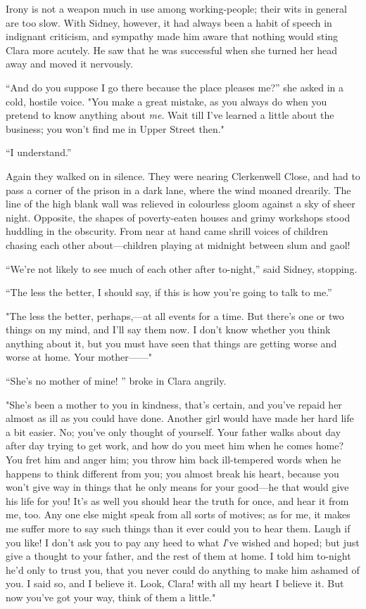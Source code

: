 Irony is not a weapon much in use among working-people; their wits in
general are too slow. With Sidney, however, it had always been a habit
of speech in indignant criticism, and sympathy made him aware that
nothing would sting Clara more acutely. He saw that he was successful
when she turned her head away and moved it nervously.

``And do you suppose I go there because the place pleases me?'' she
asked in a cold, hostile voice. "You make a great mistake, as you always
do when you pretend to know anything about \emph{me}. Wait till I've
learned a little about the business; you won't find me in Upper Street
then."

``I understand.''

Again they walked on in silence. They were nearing Clerkenwell Close,
and had to pass a corner of the prison in a dark lane, where the wind
moaned drearily. The line of the high blank wall was relieved in
colourless gloom against a sky of sheer night. {}Opposite, the shapes of
poverty-eaten houses and grimy workshops stood huddling in the
obscurity. From near at hand came shrill voices of children chasing each
other about---children playing at midnight between slum and gaol!

``We're not likely to see much of each other after to-night,'' said
Sidney, stopping.

``The less the better, I should say, if this is how you're going to talk
to me.''

"The less the better, perhaps,---at all events for a time. But there's
one or two things on my mind, and I'll say them now. I don't know
whether you think anything about it, but you must have seen that things
are getting worse and worse at home. Your mother{{------}}"

``She's no mother of mine! '' broke in Clara angrily.

"She's been a mother to you in kindness, that's certain, and you've
repaid her almost as ill as you could have done. Another girl would have
made her hard life a bit easier. No; you've only thought of yourself.
Your {}father walks about day after day trying to get work, and how do
you meet him when he comes home? You fret him and anger him; you throw
him back ill-tempered words when he happens to think different from you;
you almost break his heart, because you won't give way in things that he
only means for your good---he that would give his life for you! It's as
well you should hear the truth for once, and hear it from me, too. Any
one else might speak from all sorts of motives; as for me, it makes me
suffer more to say such things than it ever could you to hear them.
Laugh if you like! I don't ask you to pay any heed to what \emph{I}'ve
wished and hoped; but just give a thought to your father, and the rest
of them at home. I told him to-night he'd only to trust you, that you
never could do anything to make him ashamed of you. I said so, and I
believe it. Look, Clara! with all my heart I believe it. But now you've
got your way, think of them a little."

